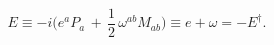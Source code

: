 \begin{equation}
E \equiv  -i \bigg(e^a P_a \, + \, \frac12 \, \omega^{ab}
M_{ab}\bigg) \equiv e + \omega = -E^\dagger.
\label{eq:E}
\end{equation}

